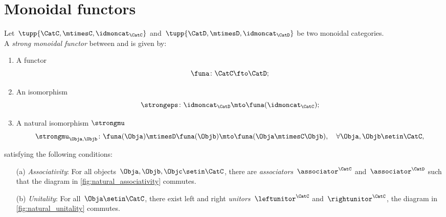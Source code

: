 
\section{Monoidal functors}
\label{sec:monoidal-functors}
\begin{ctdefinition}
    \label{def:strong-monoidal-functor}
    Let~$\tupp{\CatC,\mtimesC,\idmoncat_{\CatC}}$ and~$\tupp{\CatD,\mtimesD,\idmoncat_{\CatD}}$ be two monoidal categories.
    \\
    A \emph{strong monoidal functor} between \CatC and \CatD is given by:
    \begin{enumerate}
        \item A functor
              \begin{equation}
                  \funa \colon \CatC \fto \CatD;
              \end{equation}
        \item An isomorphism
              \begin{equation}
                  \strongeps\colon \idmoncat_{\CatD}\mto \funa(\idmoncat_{\CatC});
              \end{equation}
        \item A natural isomorphism $\strongmu$
              \begin{equation}
                  \strongmu_{\Obja,\Objb}\colon \funa(\Obja)\mtimesD \funa(\Objb) \mto \funa(\Obja \mtimesC \Objb),\quad \forall \Obja,\Objb\setin \CatC,
              \end{equation}
    \end{enumerate}
    satisfying the following conditions:
    \begin{enumerate}
        \item[(a)] \emph{Associativity}: For all objects~$\Obja,\Objb,\Objc\setin \CatC$, there are  \emph{associators}~$\associator^\CatC$ and~$\associator^\CatD$ such that the diagram in \cref{fig:natural_associativity} commutes.
        \item[(b)] \emph{Unitality}: For all~$\Obja\setin \CatC$, there exist left and right \emph{unitors}~$\leftunitor^\CatC$ and~$\rightunitor^\CatC$, the diagram in
            \cref{fig:natural_unitality} commutes.
    \end{enumerate}
\end{ctdefinition}
